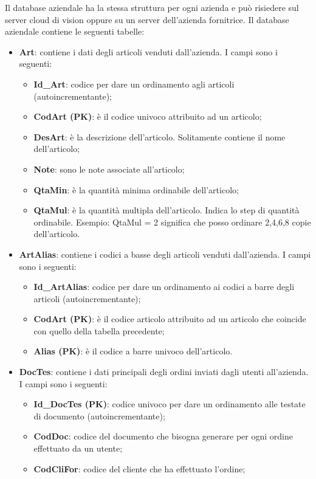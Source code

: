 Il database aziendale ha la stessa struttura per ogni azienda e può risiedere sul server cloud di vision oppure su un server dell'azienda fornitrice. Il database aziendale contiene le seguenti tabelle:
\begin{itemize}
	\item \textbf{Art}: contiene i dati degli articoli venduti dall'azienda. I campi sono i seguenti:
		\begin{itemize}
			\item \textbf{Id_Art}: codice per dare un ordinamento agli articoli (autoincrementante);
			\item \textbf{CodArt (PK)}: è il codice univoco attribuito ad un articolo;
			\item \textbf{DesArt}: è la descrizione dell'articolo. Solitamente contiene il nome dell'articolo;
			\item \textbf{Note}: sono le note associate all'articolo;
			\item \textbf{QtaMin}: è la quantità minima ordinabile dell'articolo;
			\item \textbf{QtaMul}: è la quantità multipla dell'articolo. Indica lo step di quantità ordinabile. Esempio: QtaMul = 2 significa che posso ordinare 2,4,6,8 copie dell'articolo.  
		\end{itemize}
	\item \textbf{ArtAlias}: contiene i codici a basse degli articoli venduti dall'azienda. I campi sono i seguenti:
		\begin{itemize}
			\item \textbf{Id_ArtAlias}: codice per dare un ordinamento ai codici a barre degli articoli (autoincrementante);
			\item \textbf{CodArt (PK)}: è il codice articolo attribuito ad un articolo che coincide con quello della tabella precedente;
			\item \textbf{Alias (PK)}: è il codice a barre univoco dell'articolo.
		\end{itemize}
	\item \textbf{DocTes}: contiene i dati principali degli ordini inviati dagli utenti all'azienda. I campi sono i seguenti:
		\begin{itemize}
			\item \textbf{Id_DocTes (PK)}: codice univoco per dare un ordinamento alle testate di documento (autoincrementante);
			\item \textbf{CodDoc}: codice del documento che bisogna generare per ogni ordine effettuato da un utente;
			\item \textbf{CodCliFor}: codice del cliente che ha effettuato l'ordine;

\end{itemize}
\end{itemize}
